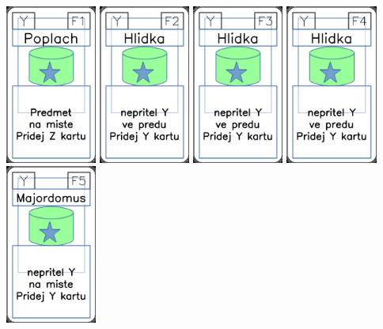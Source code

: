 \documentclass[a4paper]{article}
\begin{document}
	\includegraphics[width=3.0cm]{img-5_25}
	\includegraphics[width=3.0cm]{img-5_26}
	\includegraphics[width=3.0cm]{img-5_27}
	\includegraphics[width=3.0cm]{img-5_28}
	\includegraphics[width=3.0cm]{img-5_29}
\end{document}
